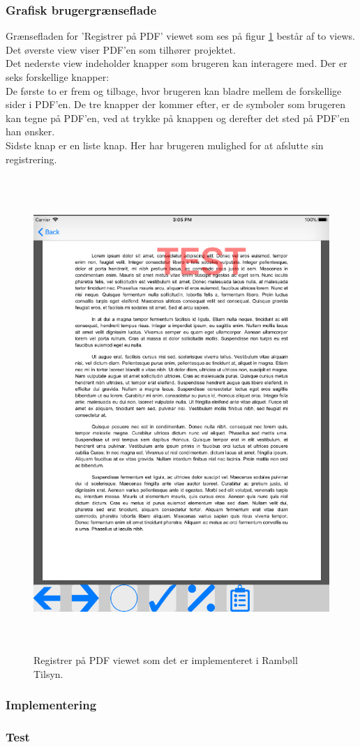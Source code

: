 \subsubsection{Grafisk brugergrænseflade}
Grænsefladen for 'Registrer på PDF' viewet som ses på figur \ref{fig:RegistrerObjekterView} består af to views. 
Det øverste view viser PDF'en som tilhører projektet. \\
Det nederste view indeholder knapper som brugeren kan interagere med. Der er seks forskellige knapper: \\
De første to er frem og tilbage, hvor brugeren kan bladre mellem de forskellige sider i PDF'en. De tre knapper der kommer efter, er de symboler som brugeren kan tegne på PDF'en, ved at trykke på knappen og derefter det sted på PDF'en han ønsker. \\
Sidste knap er en liste knap. Her har brugeren mulighed for at afslutte sin registrering.
\begin{figure}[H] %
	\centering
	\includegraphics[height=18cm, width=15cm]{Design/Applikation/RegistrePDF/PDF}
	\caption{Registrer på PDF viewet som det er implementeret i Rambøll Tilsyn.}
	\label{fig:RegistrerObjekterView}
\end{figure}

\subsubsection{Implementering}

\subsubsection{Test}

\clearpage